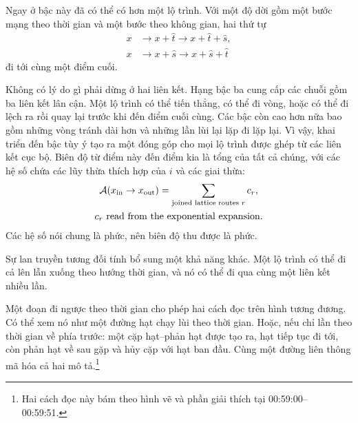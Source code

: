 Ngay ở bậc này đã có thể có hơn một lộ trình. Với một độ dời gồm một bước mạng theo thời gian và một bước theo không gian, hai thứ tự
\begin{align}
x
&\longrightarrow x+\hat t
\longrightarrow x+\hat t+\hat s,\\
x
&\longrightarrow x+\hat s
\longrightarrow x+\hat s+\hat t
\end{align}
đi tới cùng một điểm cuối.

\begin{classroomqa}
\end{classroomqa}

Không có lý do gì phải dừng ở hai liên kết. Hạng bậc ba cung cấp các chuỗi gồm ba liên kết lân cận. Một lộ trình có thể tiến thẳng, có thể đi vòng, hoặc có thể đi lệch ra rồi quay lại trước khi đến điểm cuối cùng. Các bậc còn cao hơn nữa bao gồm những vòng tránh dài hơn và những lần lùi lại lặp đi lặp lại. Vì vậy, khai triển đến bậc tùy ý tạo ra một đóng góp cho mọi lộ trình được ghép từ các liên kết cục bộ. Biên độ từ điểm này đến điểm kia là tổng của tất cả chúng, với các hệ số chứa các lũy thừa thích hợp của \(i\) và các giai thừa:
\begin{equation}
\begin{gathered}
\mathcal{A}(x_{\mathrm{in}}\to x_{\mathrm{out}})
=
\sum_{\text{joined lattice routes }r}c_r,
\\
c_r\ \hbox{read from the exponential expansion}.
\end{gathered}
\end{equation}
Các hệ số nói chung là phức, nên biên độ thu được là phức.

Sự lan truyền tương đối tính bổ sung một khả năng khác. Một lộ trình có thể đi cả lên lẫn xuống theo hướng thời gian, và nó có thể đi qua cùng một liên kết nhiều lần.

\begin{classroomqa}
\end{classroomqa}

Một đoạn đi ngược theo thời gian cho phép hai cách đọc trên hình tương đương. Có thể xem nó như một đường hạt chạy lùi theo thời gian. Hoặc, nếu chỉ lần theo thời gian về phía trước: một cặp hạt--phản hạt được tạo ra, hạt tiếp tục đi tới, còn phản hạt về sau gặp và hủy cặp với hạt ban đầu. Cùng một đường liên thông mã hóa cả hai mô tả.\footnote{Hai cách đọc này bám theo hình vẽ và phần giải thích tại 00:59:00--00:59:51.}

